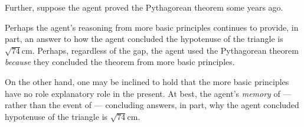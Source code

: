 \begin{note}
{    Further, suppose the agent proved the Pythagorean theorem some years ago.

    Perhaps the agent's reasoning from more basic principles continues to provide, in part, an answer to how the agent concluded the hypotenuse of the triangle is \(\sqrt{74}\text{cm}\).
    Perhaps, regardless of the gap, the agent used the Pythagorean theorem \emph{because} they concluded the theorem from more basic principles.

    On the other hand, one may be inclined to hold that the more basic principles have no role explanatory role in the present.
    At best, the agent's \emph{memory} of --- rather than the event of --- concluding answers, in part, why the agent concluded hypotenuse of the triangle is \(\sqrt{74}\text{cm}\).
  }
\end{note}

